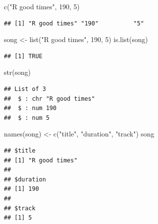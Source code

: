 \documentclass[
]{book}
\newenvironment{Shaded}{\begin{snugshade}}{\end{snugshade}}
\newcommand{\DecValTok}[1]{\textcolor[rgb]{0.00,0.00,0.81}{#1}}
\newcommand{\FunctionTok}[1]{\textcolor[rgb]{0.00,0.00,0.00}{#1}}
\newcommand{\NormalTok}[1]{#1}
\newcommand{\OtherTok}[1]{\textcolor[rgb]{0.56,0.35,0.01}{#1}}
\newcommand{\SpecialCharTok}[1]{\textcolor[rgb]{0.00,0.00,0.00}{#1}}
\newcommand{\StringTok}[1]{\textcolor[rgb]{0.31,0.60,0.02}{#1}}
\begin{document}
\begin{Shaded}
\begin{Highlighting}[]
\FunctionTok{c}\NormalTok{(}\StringTok{"R good times"}\NormalTok{, }\DecValTok{190}\NormalTok{, }\DecValTok{5}\NormalTok{)}
\end{Highlighting}
\end{Shaded}

\begin{verbatim}
## [1] "R good times" "190"          "5"
\end{verbatim}

\begin{Shaded}
\begin{Highlighting}[]
\NormalTok{song }\OtherTok{\textless{}{-}} \FunctionTok{list}\NormalTok{(}\StringTok{"R good times"}\NormalTok{, }\DecValTok{190}\NormalTok{, }\DecValTok{5}\NormalTok{)}
\FunctionTok{is.list}\NormalTok{(song)}
\end{Highlighting}
\end{Shaded}

\begin{verbatim}
## [1] TRUE
\end{verbatim}

\begin{Shaded}
\begin{Highlighting}[]
\FunctionTok{str}\NormalTok{(song)}
\end{Highlighting}
\end{Shaded}

\begin{verbatim}
## List of 3
##  $ : chr "R good times"
##  $ : num 190
##  $ : num 5
\end{verbatim}

\begin{Shaded}
\begin{Highlighting}[]
\FunctionTok{names}\NormalTok{(song) }\OtherTok{\textless{}{-}} \FunctionTok{c}\NormalTok{(}\StringTok{"title"}\NormalTok{, }\StringTok{"duration"}\NormalTok{, }\StringTok{"track"}\NormalTok{)}
\NormalTok{song}
\end{Highlighting}
\end{Shaded}

\begin{verbatim}
## $title
## [1] "R good times"
## 
## $duration
## [1] 190
## 
## $track
## [1] 5
\end{verbatim}

\begin{Shaded}
\end{Shaded}
\end{document}
